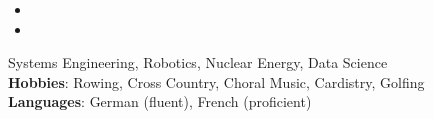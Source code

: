 \documentclass[12pt]{article}
\begin{document}
	\vspace{0.3em}
	\begin{itemize}
		\item {}
		\item {}
	\end{itemize}
	
	\spacedhrule{-.1em}{-0.7em}
	
	\vspace{-0.65cm}
	\hspace{1.9cm}
	Systems Engineering, Robotics, Nuclear Energy, Data Science \\
	\textbf{Hobbies}: Rowing, Cross Country, Choral Music, Cardistry, Golfing\\
	\textbf{Languages}: German (fluent), French (proficient)
	
\end{document}
